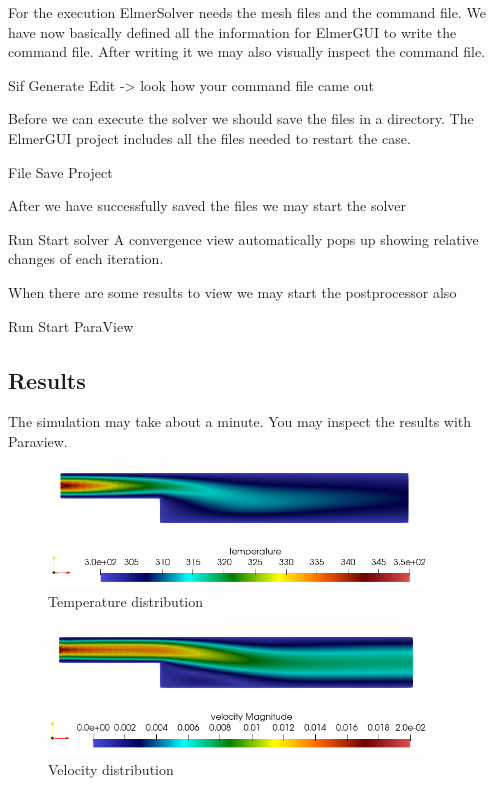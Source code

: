 For the execution ElmerSolver needs the mesh files and the command file.  We have now basically defined all the information for ElmerGUI to write the command file. After writing it we may also visually inspect the command file.

\ttbegin
Sif 
  Generate
  Edit -> look how your command file came out  
\ttend

Before we can execute the solver we should save the files in a directory. The ElmerGUI project includes all the files needed to restart the case.

\ttbegin
File 
  Save Project
\ttend

After we have successfully saved the files we may start the solver

\ttbegin
Run
  Start solver
\ttend
A convergence view automatically pops up showing relative changes of each iteration.

When there are some results to view we may start the postprocessor also

\ttbegin
Run
  Start ParaView
\ttend


\subsection*{Results}

The simulation may take about a minute.  You may inspect the results with Paraview.\\

\begin{figure}[H]
\centering
\includegraphics[width=0.9\textwidth]{temperature}
\caption{Temperature distribution}\label{fg:temp}
\end{figure} 

\begin{figure}[H]
\centering
\includegraphics[width=0.9\textwidth]{velocity}
\caption{Velocity distribution}\label{fg:velocity}
\end{figure} 

